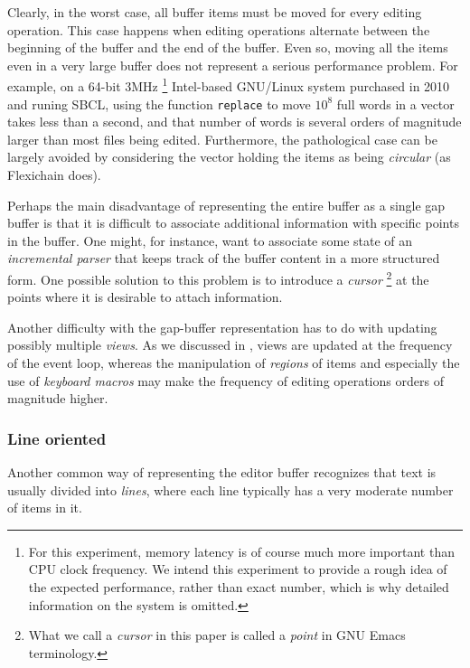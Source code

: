 Clearly, in the worst case, all buffer items must be moved for every
editing operation.  This case happens when editing operations
alternate between the beginning of the buffer and the end of the
buffer.  Even so, moving all the items even in a very large buffer
does not represent a serious performance problem.  For example, on a
64-bit 3MHz%
\footnote{For this experiment, memory latency is of course much more
  important than CPU clock frequency.  We intend this experiment to
  provide a rough idea of the expected performance, rather than exact
  number, which is why detailed information on the system is omitted.}
Intel-based GNU/Linux system purchased in 2010 and runing
SBCL, using the \commonlisp{} function \texttt{replace} to move $10^8$
full words in a vector takes less than a second, and that number of
words is several orders of magnitude larger than most files being
edited.  Furthermore, the pathological case can be largely avoided by
considering the vector holding the items as being \emph{circular} (as
Flexichain \cite{flexichain} does).

Perhaps the main disadvantage of representing the entire buffer as a
single gap buffer is that it is difficult to associate additional
information with specific points in the buffer.  One might, for
instance, want to associate some state of an \emph{incremental parser}
that keeps track of the buffer content in a more structured form.
One possible solution to this problem is to introduce a \emph{cursor}%
\footnote{What we call a \emph{cursor} in this paper is called a
  \emph{point} in GNU Emacs terminology.} at the points where it is
desirable to attach information.

Another difficulty with the gap-buffer representation has to do with
updating possibly multiple \emph{views}.  As we discussed in
, views are updated at the frequency of the
event loop, whereas the manipulation of \emph{regions} of items and
especially the use of \emph{keyboard macros} may make the frequency of
editing operations orders of magnitude higher.

\subsubsection{Line oriented}
\label{sec-previous-line-oriented}

Another common way of representing the editor buffer recognizes that
text is usually divided into \emph{lines}, where each line typically
has a very moderate number of items in it.


